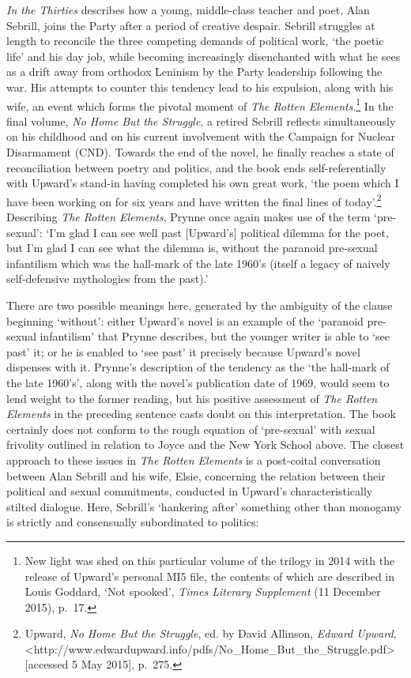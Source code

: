 \documentclass[]{article}
\begin{document}
\emph{In the Thirties} describes how a young, middle-class teacher and
poet, Alan Sebrill, joins the Party after a period of creative despair.
Sebrill struggles at length to reconcile the three competing demands of
political work, `the poetic life' and his day job, while becoming
increasingly disenchanted with what he sees as a drift away from
orthodox Leninism by the Party leadership following the war. His
attempts to counter this tendency lead to his expulsion, along with his
wife, an event which forms the pivotal moment of \emph{The Rotten
Elements}.\footnote{New light was shed on this particular volume of the
  trilogy in 2014 with the release of Upward's personal MI5 file, the
  contents of which are described in Louis Goddard, `Not spooked',
  \emph{Times Literary Supplement} (11 December 2015), p.~17.} In the
final volume, \emph{No Home But the Struggle}, a retired Sebrill
reflects simultaneously on his childhood and on his current involvement
with the Campaign for Nuclear Disarmament (CND). Towards the end of the
novel, he finally reaches a state of reconciliation between poetry and
politics, and the book ends self-referentially with Upward's stand-in
having completed his own great work, `the poem which I have been working
on for six years and have written the final lines of today'.\footnote{Upward,
  \emph{No Home But the Struggle}, ed. by David Allinson, \emph{Edward
  Upward},
  \textless{}http://www.edwardupward.info/pdfs/No\_Home\_But\_the\_Struggle.pdf\textgreater{}
  {[}accessed 5 May 2015{]}, p.~275.} Describing \emph{The Rotten
Elements}, Prynne once again makes use of the term `pre-sexual': `I'm
glad I can see well past {[}Upward's{]} political dilemma for the poet,
but I'm glad I can see what the dilemma is, without the paranoid
pre-sexual infantilism which was the hall-mark of the late 1960's
(itself a legacy of naively self-defensive mythologies from the past).'

There are two possible meanings here, generated by the ambiguity of the
clause beginning `without': either Upward's novel is an example of the
`paranoid pre-sexual infantilism' that Prynne describes, but the younger
writer is able to `see past' it; or he is enabled to `see past' it
precisely because Upward's novel dispenses with it. Prynne's description
of the tendency as the `the hall-mark of the late 1960's', along with
the novel's publication date of 1969, would seem to lend weight to the
former reading, but his positive assessment of \emph{The Rotten
Elements} in the preceding sentence casts doubt on this interpretation.
The book certainly does not conform to the rough equation of
`pre-sexual' with sexual frivolity outlined in relation to Joyce and the
New York School above. The closest approach to these issues in \emph{The
Rotten Elements} is a post-coital conversation between Alan Sebrill and
his wife, Elsie, concerning the relation between their political and
sexual commitments, conducted in Upward's characteristically stilted
dialogue. Here, Sebrill's `hankering after' something other than
monogamy is strictly and consensually subordinated to politics:
\end{document}
